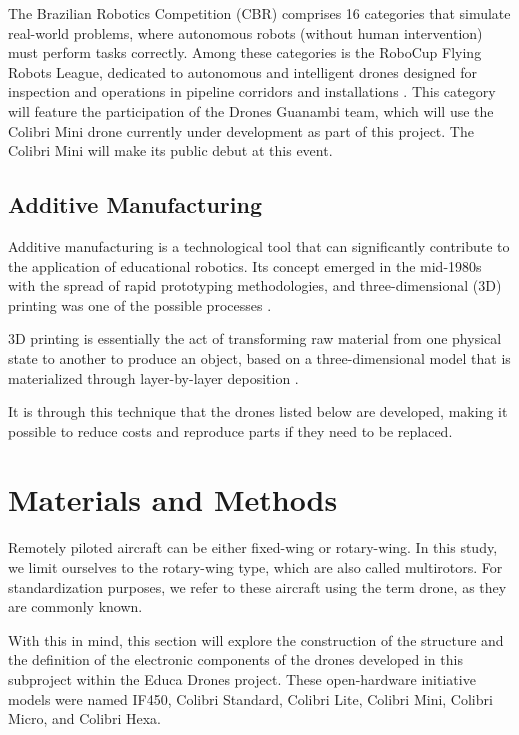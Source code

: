 \documentclass[conference]{IEEEtran}
\begin{document}
The Brazilian Robotics Competition (CBR) comprises 16 categories that simulate real-world problems, where autonomous robots (without human intervention) must perform tasks correctly. Among these categories is the RoboCup Flying Robots League, dedicated to autonomous and intelligent drones designed for inspection and operations in pipeline corridors and installations \cite{b3}. This category will feature the participation of the Drones Guanambi team, which will use the Colibri Mini drone currently under development as part of this project. The Colibri Mini will make its public debut at this event.

\subsection{Additive Manufacturing}

Additive manufacturing is a technological tool that can significantly contribute to the application of educational robotics. Its concept emerged in the mid-1980s with the spread of rapid prototyping methodologies, and three-dimensional (3D) printing was one of the possible processes \cite{b10}.

3D printing is essentially the act of transforming raw material from one physical state to another to produce an object, based on a three-dimensional model that is materialized through layer-by-layer deposition \cite{b8}.

It is through this technique that the drones listed below are developed, making it possible to reduce costs and reproduce parts if they need to be replaced.

\section{Materials and Methods}

Remotely piloted aircraft can be either fixed-wing or rotary-wing. In this study, we limit ourselves to the rotary-wing type, which are also called multirotors. For standardization purposes, we refer to these aircraft using the term drone, as they are commonly known.

With this in mind, this section will explore the construction of the structure and the definition of the electronic components of the drones developed in this subproject within the Educa Drones project. These open-hardware initiative models were named IF450, Colibri Standard, Colibri Lite, Colibri Mini, Colibri Micro, and Colibri Hexa.
\end{document}
